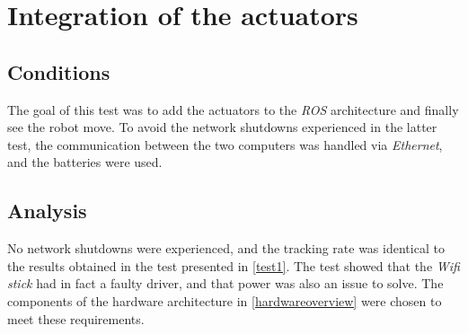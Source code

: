 	\section{Integration of the actuators}
		
		\subsection{Conditions}
		
		The goal of this test was to add the actuators 
		to the \textit{ROS} architecture and finally 
		see the robot move. To avoid the network shutdowns 
		experienced in the latter test, the communication
		between the two computers
		was handled via \textit{Ethernet}, and the batteries
		were used. 
		
		\subsection{Analysis}
		
		No network shutdowns were experienced, and 
		the tracking rate was identical to
		the results obtained in the test 
		presented in \vref{test1}. The test 
		showed that the \textit{Wifi stick}
		had in fact a faulty driver, and that 
		power was also an issue to solve.
		The components of the hardware architecture in \vref{hardwareoverview} were chosen
		to meet these requirements.
		
		\FloatBarrier
		
